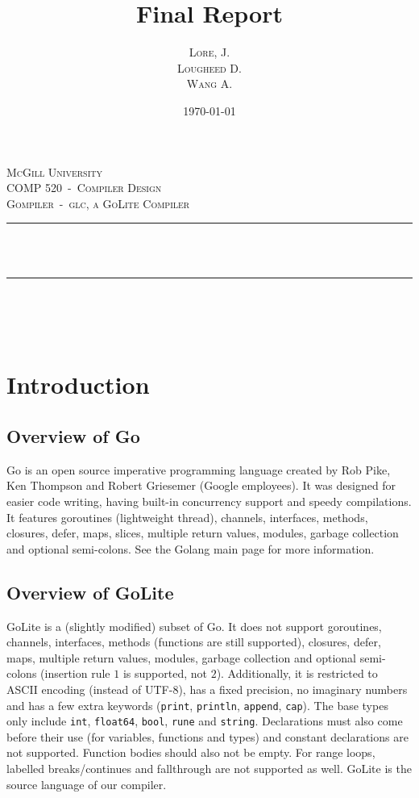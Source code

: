 \documentclass[11pt]{article}
\author{\textsc{Lore}, J.\\ \textsc{Lougheed} D.\\ \textsc{Wang} A.}
\date{\today}
\title{Final Report}
\newcommand{\HRule}{\rule{\linewidth}{0.5mm}}
\begin{document}
\begin{titlepage}
  \center%

  \textsc{\LARGE McGill University}\\[1.5cm]
  \textsc{\Large COMP 520~-~Compiler Design}\\[0.5cm]
  \textsc{\large Gompiler~-~glc, a GoLite Compiler}\\[0.5cm]

  \HRule~\\[0.4cm]
  { \huge \bfseries \thetitle}\\[0.4cm]
  \HRule~\\[1.5cm]

  \theauthor\\%
  [3cm]

  {\large \thedate}\\[2cm]

  \vfill

\end{titlepage}
\tableofcontents
\newpage
\section{Introduction}
\subsection{Overview of Go\cite{goliteinfo}}
Go is an open source imperative programming language created by Rob Pike, Ken
Thompson and Robert Griesemer (Google employees). It was designed for
easier code writing, having built-in concurrency support and speedy
compilations. It features goroutines (lightweight thread), channels,
interfaces, methods, closures, defer, maps, slices, multiple return
values, modules, garbage collection and optional semi-colons. See the
Golang main page\cite{golang} for more information.
\subsection{Overview of GoLite\cite{goliteinfo}}
GoLite is a (slightly modified) subset of Go. It does not support
goroutines, channels, interfaces, methods (functions are still
supported), closures, defer, maps, multiple return values, modules,
garbage collection and optional semi-colons (insertion
rule\cite{gospec:semicolon} $1$ is supported, not $2$). Additionally,
it is restricted to ASCII encoding (instead of UTF-8), has a fixed
precision, no imaginary numbers and has a few extra keywords
(\texttt{print}, \texttt{println}, \texttt{append}, \texttt{cap}). The
base types only include \texttt{int}, \texttt{float64}, \texttt{bool},
\texttt{rune} and \texttt{string}. Declarations must also come before
their use (for variables, functions and types) and constant
declarations are not supported. Function bodies should also not be
empty. For range loops, labelled breaks/continues and fallthrough are
not supported as well. GoLite is the source language of our compiler.
\end{document}
